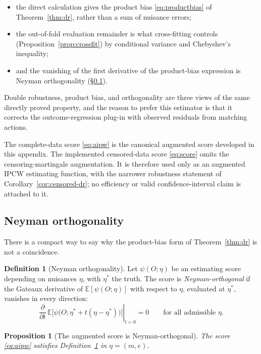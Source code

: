 \documentclass[11pt,a4paper]{article}
\theoremstyle{plain}
\newtheorem{proposition}[theorem]{Proposition}
\theoremstyle{definition}
\newtheorem{definition}[theorem]{Definition}
\theoremstyle{remark}
\newcommand{\E}{\mathbb E}
\begin{document}
\begin{itemize}[leftmargin=*]
\item the direct calculation gives the product bias \eqref{eq:productbias} of
Theorem~\ref{thm:dr}, rather than a sum of nuisance errors;
\item the out-of-fold evaluation remainder is what cross-fitting controls
(Proposition~\ref{prop:crossfit}) by conditional variance and Chebyshev's inequality;
\item and the vanishing of the first derivative of the product-bias expression is Neyman
orthogonality (\S\ref{app:neyman}).
\end{itemize}

Double robustness, product bias, and orthogonality are three views of the same directly proved
property, and the reason to prefer this estimator is that it corrects the outcome-regression
plug-in with observed residuals from matching actions.

The complete-data score \eqref{eq:aipw} is the canonical augmented score developed in this
appendix. The implemented censored-data score \eqref{eq:score} omits the censoring-martingale
augmentation. It is therefore used only as an augmented IPCW estimating function, with the
narrower robustness statement of Corollary~\ref{cor:censored-dr}; no efficiency or valid
confidence-interval claim is attached to it.

\subsection{Neyman orthogonality}\label{app:neyman}

There is a compact way to say why the product-bias form of Theorem~\ref{thm:dr} is not a
coincidence.

\begin{definition}[Neyman orthogonality]\label{def:neyman}
Let $\psi(O;\eta)$ be an estimating score depending on nuisances $\eta$, with $\eta^\ast$ the
truth. The score is \emph{Neyman-orthogonal} if the Gateaux derivative of $\E[\psi(O;\eta)]$
with respect to $\eta$, evaluated at $\eta^\ast$, vanishes in every direction:
\[
\left.\frac{\partial}{\partial t}\,\E\bigl[\psi\bigl(O;\eta^\ast+t(\eta-\eta^\ast)\bigr)\bigr]\right|_{t=0}=0
\qquad\text{for all admissible }\eta .
\]
\end{definition}

\begin{proposition}[The augmented score is Neyman-orthogonal]\label{prop:neyman}
The score \eqref{eq:aipw} satisfies Definition~\ref{def:neyman} in $\eta=(m,e)$.
\end{proposition}
\end{document}
